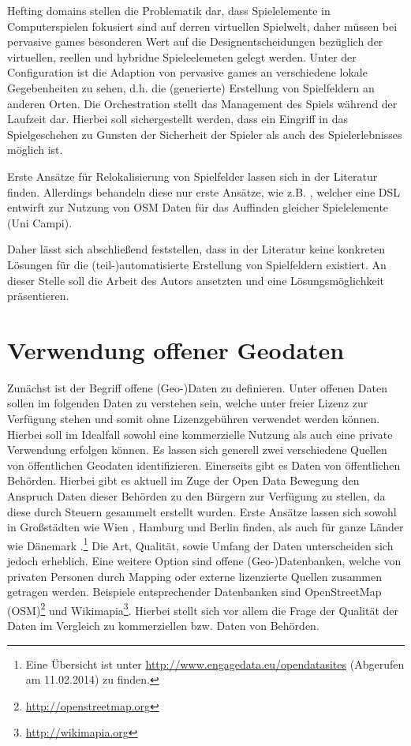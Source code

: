 Hefting domains stellen die Problematik dar, dass Spielelemente in Computerspielen fokusiert sind auf derren virtuellen Spielwelt, daher müssen bei pervasive games besonderen Wert auf die Designentscheidungen bezüglich der virtuellen, reellen und hybridne Spieleelemeten gelegt werden.
Unter der Configuration ist die Adaption von pervasive games an verschiedene lokale Gegebenheiten zu sehen, d.h. die (generierte) Erstellung von Spielfeldern an anderen Orten.
Die Orchestration stellt das Management des Spiels während der Laufzeit dar. Hierbei soll sichergestellt werden, dass ein Eingriff in das Spielgeschehen zu Gunsten der Sicherheit der Spieler als auch des Spielerlebnisses möglich ist.

Erste Ansätze für Relokalisierung von Spielfelder lassen sich in der Literatur finden. Allerdings behandeln diese nur erste Ansätze, wie z.B. \citep{Mannara.2012}, welcher eine DSL entwirft zur Nutzung von OSM Daten für das Auffinden gleicher Spielelemente (Uni Campi).

Daher lässt sich abschließend feststellen, dass in der Literatur keine konkreten Lösungen für die (teil-)automatisierte Erstellung von Spielfeldern existiert.
An dieser Stelle soll die Arbeit des Autors ansetzten und eine Lösungsmöglichkeit präsentieren.

\section{Verwendung offener Geodaten}
\label{ch3:s:offeneGeodaten}

Zunächst ist der Begriff offene (Geo-)Daten zu definieren.
Unter offenen Daten sollen im folgenden Daten zu verstehen sein, welche unter freier Lizenz zur Verfügung stehen und somit ohne Lizenzgebühren verwendet werden können. Hierbei soll im Idealfall sowohl eine kommerzielle Nutzung als auch eine private Verwendung erfolgen können.
Es lassen sich generell zwei verschiedene Quellen von öffentlichen Geodaten identifizieren.
Einerseits gibt es Daten von öffentlichen Behörden. Hierbei gibt es aktuell im Zuge der Open Data Bewegung \cite{Oreilly.2007} den Anspruch Daten dieser Behörden zu den Bürgern zur Verfügung zu stellen, da diese durch Steuern gesammelt erstellt wurden. Erste Ansätze lassen sich sowohl in Großstädten wie Wien \cite{Wien.2014}, Hamburg \cite{Hamburg.2014} und Berlin \cite{Berlin.2014} finden, als auch für ganze Länder wie Dänemark \cite{Denmark.2014}.\footnote{Eine Übersicht ist unter \url{http://www.engagedata.eu/opendatasites} (Abgerufen am 11.02.2014) zu finden. } Die Art, Qualität, sowie Umfang der Daten unterscheiden sich jedoch erheblich. 
Eine weitere Option sind offene (Geo-)Datenbanken, welche von privaten Personen durch Mapping oder externe lizenzierte Quellen zusammen getragen werden.
Beispiele entsprechender Datenbanken sind OpenStreetMap (OSM)\footnote{\url{http://openstreetmap.org}} und Wikimapia\footnote{\url{http://wikimapia.org}}.
Hierbei stellt sich vor allem die Frage der Qualität der Daten im Vergleich zu kommerziellen bzw. Daten von Behörden.

